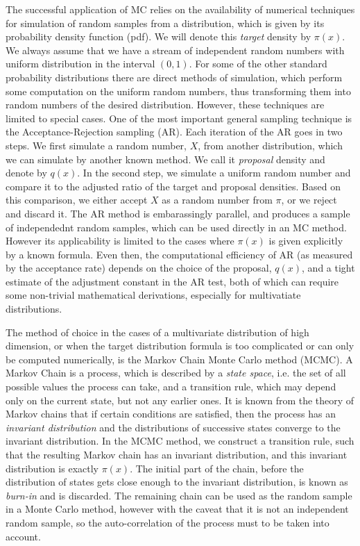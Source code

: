 \documentclass[11pt]{article}       %
\begin{document}
The successful application of MC relies on the availability of numerical
techniques for simulation of random samples from a distribution, which is given
by its probability density function (pdf).  We will denote this \emph{target}
density by $\pi(x)$.  We always assume that we have a stream of independent
random numbers with uniform distribution in the interval $(0,1)$.  For some of
the other standard probability distributions there are direct methods of
simulation, which perform some computation on the uniform random numbers, thus
transforming them into random numbers of the desired distribution.  However,
these techniques are limited to special cases.  One of the most important
general sampling technique is the Acceptance-Rejection sampling (AR).  Each
iteration of the AR goes in two steps.  We first simulate a random number, $X$,
from another distribution, which we can simulate by another known method.  We
call it \emph{proposal} density and denote by $q(x)$.  In the second step, we
simulate a uniform random number and compare it to the adjusted ratio of the
target and proposal densities.  Based on this comparison, we either accept $X$
as a random number from $\pi$, or we reject and discard it.  The AR method is
embarassingly parallel, and produces a sample of independednt random samples,
which can be used directly in an MC method.  However its applicability is
limited to the cases where $\pi(x)$ is given explicitly by a known formula.
Even then, the computational efficiency of AR (as measured by the acceptance
rate) depends on the choice of the proposal, $q(x)$, and a tight estimate of
the adjustment constant in the AR test, both of which can require some
non-trivial mathematical derivations, especially for multivatiate
distributions.  

The method of choice in the cases of a multivariate distribution of high
dimension, or when the target distribution formula is too complicated or can
only be computed numerically, is the Markov Chain Monte Carlo method (MCMC).  A
Markov Chain is a process, which is described by a \emph{state space}, i.e. the
set of all possible values the process can take, and a transition rule, which
may depend only on the current state, but not any earlier ones. It is known
from the theory of Markov chains that if certain conditions are satisfied, then
the process has an \emph{invariant distribution} and the distributions of
successive states converge to the invariant distribution.  In the MCMC method,
we construct a transition rule, such that the resulting Markov chain has an
invariant distribution, and this invariant distribution is exactly $\pi(x)$.
The initial part of the chain, before the distribution of states gets close
enough to the invariant distribution, is known as \emph{burn-in} and is
discarded.  The remaining chain can be used as the random sample in a Monte
Carlo method, however with the caveat that it is not an independent random
sample, so the auto-correlation of the process must to be taken into account.
\end{document}
